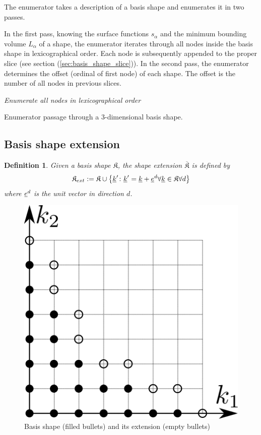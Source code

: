 \documentclass{article}
\newtheorem{definition}{Definition}
\begin{document}
The enumerator takes a description of a basis shape and enumerates it in two passes.

In the first pass, knowing the surface functions \(s_{\alpha}\)
and the minimum bounding volume \(L_{\alpha}\) of a shape,
the enumerator iterates through all nodes inside the basis shape in lexicographical order.
Each node is subsequently appended to the proper slice (see section (\ref{sec:basis_shape_slice})).
In the second pass, the enumerator determines the offset (ordinal of first node) of each shape.
The offset is the number of all nodes in previous slices.

\begin{algorithm}[H]
  \emph{Enumerate all nodes in lexicographical order}\;
  \caption{Enumerator passage through a 3-dimensional basis shape.}
\end{algorithm}

\subsection{Basis shape extension}

\begin{definition}
  Given a basis shape \( \mathfrak{K} \),
  the shape extension \( \overline{\mathfrak{K}} \) is defined by
  \begin{equation}
    \mathfrak{K}_{ext} := \mathfrak{K} \cup 
    \left\{\underline{k}' \colon \underline{k}' = \underline{k} + \underline{e}^d 
      \forall \underline{k} \in \mathfrak{K} \forall d\right\}
  \end{equation}
  where \( \underline{e}^d \) is the unit vector in direction \( d \).
\end{definition}

\begin{figure}[H]
  \begin{center}
    \includegraphics[width=0.5\linewidth]{shape_extension}
  \end{center}
  \caption{Basis shape (filled bullets) and its extension (empty
    bullets)}
\end{figure}
\end{document}
